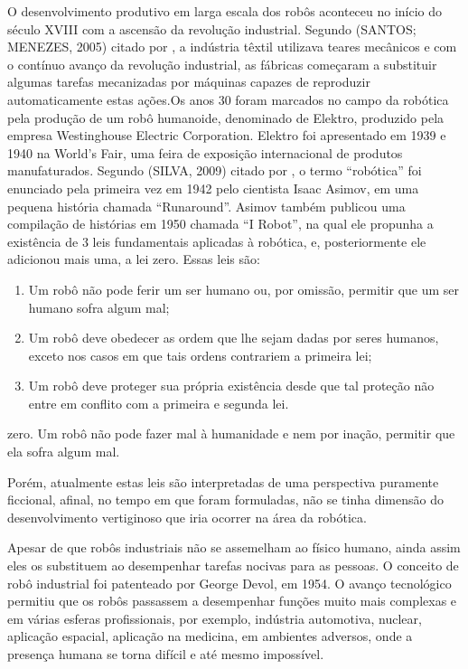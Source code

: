 O desenvolvimento produtivo em larga escala dos robôs aconteceu no início do século XVIII com a ascensão da revolução industrial. Segundo (SANTOS; MENEZES, 2005) citado por , a indústria têxtil utilizava teares mecânicos e com o contínuo avanço da revolução industrial, as fábricas começaram a substituir algumas tarefas mecanizadas por máquinas capazes de reproduzir automaticamente estas ações.Os anos 30 foram marcados no campo da robótica pela produção de um robô humanoide, denominado de Elektro, produzido pela empresa Westinghouse Electric Corporation. Elektro foi apresentado em 1939 e 1940 na World’s Fair,  uma feira de exposição internacional de produtos manufaturados. Segundo (SILVA, 2009) citado por , o termo “robótica” foi enunciado pela primeira vez em 1942 pelo cientista Isaac Asimov, em uma pequena história chamada “Runaround”. Asimov também publicou uma compilação de histórias em 1950 chamada “I Robot”, na qual ele propunha a existência de 3 leis fundamentais aplicadas à robótica, e, posteriormente ele adicionou mais uma, a lei zero. Essas leis são:

\begin{enumerate}
	\item Um robô não pode ferir um ser humano ou, por omissão, permitir que um ser humano sofra algum mal;
	\item Um robô deve obedecer as ordem que lhe sejam dadas por seres humanos, exceto nos casos em que tais ordens contrariem a primeira lei;
	\item Um robô deve proteger sua própria existência desde que tal proteção não entre em conflito com a primeira e segunda lei.
\end{enumerate}

zero.     Um robô não pode fazer mal à humanidade e nem por inação, permitir que ela sofra algum mal.

Porém, atualmente estas leis são interpretadas de uma perspectiva puramente ficcional, afinal, no tempo em que foram formuladas, não se tinha dimensão do desenvolvimento vertiginoso que iria ocorrer na área da robótica.

Apesar de que robôs industriais não se assemelham ao físico humano, ainda assim eles os substituem ao desempenhar tarefas nocivas para as pessoas. O conceito de robô industrial foi patenteado por George Devol, em 1954. O avanço tecnológico permitiu que os robôs passassem a desempenhar funções muito mais complexas e em várias esferas profissionais, por exemplo, indústria automotiva, nuclear, aplicação espacial, aplicação na medicina, em  ambientes adversos, onde a presença humana se torna difícil e até mesmo impossível.

